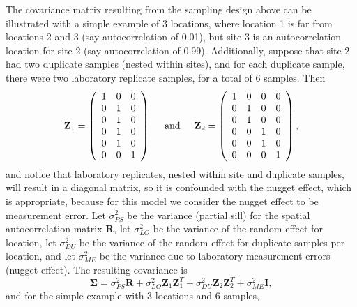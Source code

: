 \documentclass[12pt, titlepage]{article}
\begin{document}
The covariance matrix resulting from the sampling design above can be illustrated with a simple example of 3 locations, where location 1 is far from locations 2 and 3 (say autocorrelation of 0.01), but site 3 is an autocorrelation location for site 2 (say autocorrelation of 0.99).  Additionally, suppose that site 2 had two duplicate samples (nested within sites), and for each duplicate sample, there were two laboratory replicate samples, for a total of 6 samples.  Then
$$
\mathbf{Z}_{1} = \left(
\begin{array}{ccc}
	1 & 0 & 0 \\
	0 & 1 & 0 \\
	0 & 1 & 0 \\
	0 & 1 & 0 \\
	0 & 1 & 0 \\
	0 & 0 & 1 \\
\end{array}
\right) 
\hspace{.5 cm} \textrm{and} \hspace{.5cm} 
\mathbf{Z}_{2} = \left(
\begin{array}{cccc}
	1 & 0 & 0 & 0 \\
	0 & 1 & 0 & 0 \\
	0 & 1 & 0 & 0 \\
	0 & 0 & 1 & 0 \\
	0 & 0 & 1 & 0 \\
	0 & 0 & 0 & 1 \\
\end{array}
\right), 
$$
and notice that laboratory replicates, nested within site and duplicate samples, will result in a diagonal matrix, so it is confounded with the nugget effect, which is appropriate, because for this model we consider the nugget effect to be measurement error.  Let $\sigma^{2}_{PS}$ be the variance (partial sill) for the spatial autocorrelation matrix $\mathbf{R}$, let $\sigma^{2}_{LO}$ be the variance of the random effect for location, let $\sigma^{2}_{DU}$ be the variance of the random effect for duplicate samples per location, and let $\sigma^{2}_{ME}$ be the variance due to laboratory measurement errors (nugget effect).  The resulting covariance is
$$
\boldsymbol{\Sigma} = \sigma^{2}_{PS}\mathbf{R} + \sigma^{2}_{LO}\mathbf{Z}_{1}\mathbf{Z}_{1}^{T} + \sigma^{2}_{DU}\mathbf{Z}_{2}\mathbf{Z}_{2}^{T} + \sigma^{2}_{ME}\mathbf{I},
$$
and for the simple example with 3 locations and 6 samples,
\end{document}
